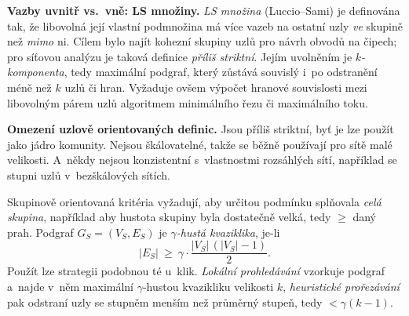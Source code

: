 \documentclass[11pt,a4paper]{article}
\theoremstyle{definition}
\begin{document}
\begin{defbox}
\textbf{Vazby uvnitř vs.\ vně: LS množiny.} \emph{LS množina} (Luccio--Sami) je definována tak,
že libovolná její vlastní podmnožina má více vazeb na ostatní uzly \emph{ve} skupině než
\emph{mimo} ni. Cílem bylo najít kohezní skupiny uzlů pro návrh obvodů na čipech; pro síťovou
analýzu je taková definice \emph{příliš striktní}. Jejím uvolněním je \emph{$k$-komponenta},
tedy maximální podgraf, který zůstává souvislý i~po odstranění méně než $k$ uzlů či hran.
Vyžaduje ovšem výpočet hranové souvislosti mezi libovolným párem uzlů algoritmem minimálního
řezu či maximálního toku.

\textbf{Omezení uzlově orientovaných definic.} Jsou příliš striktní, byť je lze použít jako
jádro komunity. Nejsou škálovatelné, takže se běžně používají pro sítě malé velikosti. A~někdy
nejsou konzistentní s~vlastnostmi rozsáhlých sítí, například se stupni uzlů v~bezškálových
sítích.
\end{defbox}

\begin{defbox}
Skupinově orientovaná kritéria vyžadují, aby určitou podmínku splňovala \emph{celá skupina},
například aby hustota skupiny byla dostatečně velká, tedy $\ge$ daný prah. Podgraf
$G_S=(V_S,E_S)$ je \emph{$\gamma$-hustá kvaziklika}, je-li
\[ |E_S|\ \ge\ \gamma\cdot\frac{|V_S|\,(|V_S|-1)}{2}. \]
Použít lze strategii podobnou té u~klik. \emph{Lokální prohledávání} vzorkuje podgraf a~najde
v~něm maximální $\gamma$-hustou kvazikliku velikosti $k$, \emph{heuristické prořezávání} pak
odstraní uzly se stupněm menším než průměrný stupeň, tedy $<\gamma(k-1)$.
\end{defbox}
\end{document}
